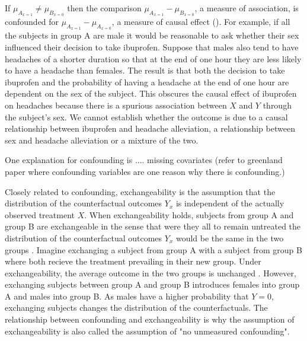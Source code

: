 \documentclass[11pt]{article}
\begin{document}
If \(\mu_{A_{x = 1}} \neq \mu_{B_{x=0}}\) then the comparison
\(\mu_{A_{x = 1}} - \mu_{B_{x=0}}\), a measure of association, is
confounded for \(\mu_{A_{x = 1}} - \mu_{A_{x = 0}}\), a measure of
causal effect (\citet{Greenland1999}). For example, if all the subjects
in group A are male it would be reasonable to ask whether their sex
influenced their decision to take ibuprofen. Suppose that males also
tend to have headaches of a shorter duration so that at the end of one
hour they are less likely to have a headache than females. The result is
that both the decision to take ibuprofen and the probability of having a
headache at the end of one hour are dependent on the sex of the subject.
This obscures the causal effect of ibuprofen on headaches because there
is a spurious association between \(X\) and \(Y\) through the subject's
sex. We cannot establish whether the outcome is due to a causal
relationship between ibuprofen and headache alleviation, a relationship
between sex and headache alleviation or a mixture of the two. \linebreak

One explanation for confounding is .... missing covariates (refer to
greenland paper where confounding variables are one reason why there is
confounding.)

Closely related to confounding, exchangeability is the assumption that
the distribution of the counterfactual outcomes \(Y_{x}\) is independent
of the actually observed treatment \(X\). When exchangeability holds,
subjects from group A and group B are exchangeable in the sense that
were they all to remain untreated the distribution of the counterfactual
outcomes \(Y_{x}\) would be the same in the two groups
\citet{Daniel2013}. Imagine exchanging a subject from group A with a
subject from group B where both recieve the treatment prevailing in
their new group. Under exchangeability, the average outcome in the two
groups is unchanged \citet{HernanMA2018}. However, exchanging subjects
between group A and group B introduces females into group A and males
into group B. As males have a higher probability that \(Y = 0\),
exchanging subjects changes the distribution of the counterfactuals. The
relationship between confounding and exchangeability is why the
assumption of exchangeability is also called the assumption of "no
unmeasured confounding". \linebreak
\end{document}
